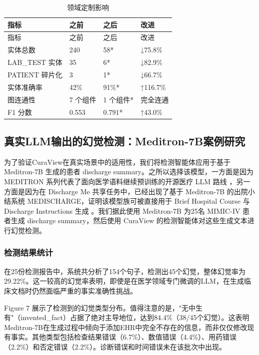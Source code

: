 \documentclass[11pt]{article}
\begin{document}
\begin{longtable}[]{@{}llll@{}}
\caption{领域定制影响}\tabularnewline
\toprule\noalign{}
指标 & 之前 & 之后 & 改进 \\
\midrule\noalign{}
\endfirsthead
\toprule\noalign{}
指标 & 之前 & 之后 & 改进 \\
\midrule\noalign{}
\endhead
\bottomrule\noalign{}
\endlastfoot
实体总数 & 240 & 58* & ↓75.8\% \\
LAB\_TEST 实体 & 35 & 6* & ↓82.9\% \\
PATIENT 碎片化 & 3 & 1* & ↓66.7\% \\
实体准确率 & 42\% & 91\%* & ↑116.7\% \\
图连通性 & 7 个组件 & 1 个组件* & 完全连通 \\
F1 分数 & 0.553 & 0.791* & ↑43.0\% \\
\end{longtable}

\subsection{真实LLM输出的幻觉检测：Meditron-7B案例研究}

为了验证CuraView在真实场景中的适用性，我们将检测智能体应用于基于 Meditron-7B 生成的患者 discharge summary。之所以选择该模型，一方面是因为 MEDITRON 系列代表了面向医学语料继续预训练的开源医疗 LLM 路线 \citep{chen2023meditron70b}，另一方面是因为在 Discharge Me 共享任务中，已经出现了基于 Meditron-7B 的出院小结系统 MEDISCHARGE，证明该模型族可被直接用于 Brief Hospital Course 与 Discharge Instructions 生成 \citep{wu2024epflMakeDischargeMe}。我们据此使用 Meditron-7B 为25名 MIMIC-IV 患者生成 discharge summary，然后使用 CuraView 的检测智能体对这些生成文本进行幻觉检测。

\subsubsection{检测结果统计}

在25份检测报告中，系统共分析了154个句子，检测出45个幻觉，整体幻觉率为29.22\%。这一较高的幻觉率表明，即使是在医学领域专门微调的LLM，在生成临床文档时仍然面临严重的事实准确性挑战。

Figure 7 展示了检测到的幻觉类型分布。值得注意的是，"无中生有"（invented\_fact）占据了绝对主导地位，达到84.4\%（38/45个幻觉）。这表明Meditron-7B在生成过程中倾向于添加EHR中完全不存在的信息，而非仅仅修改现有事实。其他类型包括检查结果错误（6.7\%）、数值错误（4.4\%）、用药错误（2.2\%）和否定错误（2.2\%）。诊断错误和时间错误未在该批次中出现。
\end{document}
